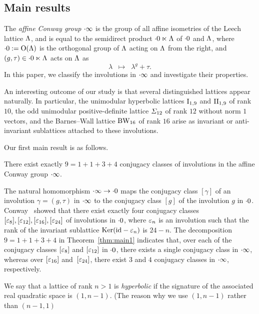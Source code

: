 \documentclass{amsart} %
\begin{document}
\subsection{Main results}
%
The \emph{affine Conway group} $\cdot \infty$ is the group of 
all affine isometries of the Leech lattice $\Lambda$,
and is equal to the semidirect product $\cdot 0 \ltimes \Lambda$
of $\cdot 0$ and $\Lambda$,
where $\cdot 0:=\mathord{\mathrm{O}}(\Lambda)$ is the orthogonal group of $\Lambda$
acting on $\Lambda$ from the right, and 
$(g, \tau)\in \cdot 0 \ltimes \Lambda$ acts on $\Lambda$ as
\[
\lambda\;\;\mapsto\;\; \lambda^g+\tau.
\]
In this paper,
we classify the involutions in $\cdot \infty$ and investigate their properties. 
\par
An interesting outcome of our study is that 
several distinguished lattices appear naturally. 
In particular, the unimodular hyperbolic lattices $\mathrm{I}_{1, 9}$ and $\mathrm{II}_{1, 9}$ of rank $10$, 
the odd unimodular positive-definite lattice $\varSigma_{12}$ 
of rank $12$ without norm $1$ vectors, 
and the Barnes--Wall lattice $\mathrm{BW}_{16}$ of rank $16$ 
arise as invariant or anti-invariant sublattices attached to these involutions.
\par
Our first main result is as follows.
%
%
\begin{theorem}\label{thm:main1}
There exist exactly 
$9=1+1+3+4$
conjugacy classes of involutions in the affine Conway group $\cdot \infty$.
\end{theorem}
%
The natural homomorphism $\cdot \infty \to \cdot 0$ maps
the conjugacy class $[\gamma]$ of an involution $\gamma=(g, \tau)$
in $\cdot \infty$ to the conjugacy class $[g]$ of the involution $g$ in $\cdot 0$. 
Conway~\cite[Chapter 10,~Section 3.7]{theCSbook}
showed that there exist exactly four conjugacy classes
$[\varepsilon_8], [\varepsilon_{12}], [\varepsilon_{16}], [\varepsilon_{24}]$ of involutions in $\cdot 0$,
where $\varepsilon_n$ is an involution such that the rank of 
the invariant sublattice 
$\operatorname{Ker}(\mathord{\mathrm{id}}-\varepsilon_n)$ is $24-n$.
The decomposition $9=1+1+3+4$ in Theorem~\ref{thm:main1} 
indicates that, over each of the conjugacy classes $[\varepsilon_8]$ and $ [\varepsilon_{12}]$ in $\cdot 0$,
there exists a single conjugacy class in $\cdot \infty$,
whereas over %
$[\varepsilon_{16}]$ and~$ [\varepsilon_{24}]$, %
there exist $3$ and $4$ conjugacy classes
in $\cdot \infty$, respectively.
\par
%
We say that a lattice of rank $n>1$ is \emph{hyperbolic}
if the signature of the associated real quadratic space is $(1, n-1)$.
(The reason why we use $(1, n-1)$ rather than $(n-1, 1)$ 
\end{document}
